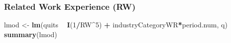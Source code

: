 \documentclass[
]{article}
\newenvironment{Shaded}{\begin{snugshade}}{\end{snugshade}}
\newcommand{\DecValTok}[1]{\textcolor[rgb]{0.00,0.00,0.81}{#1}}
\newcommand{\KeywordTok}[1]{\textcolor[rgb]{0.13,0.29,0.53}{\textbf{#1}}}
\newcommand{\NormalTok}[1]{#1}
\newcommand{\OperatorTok}[1]{\textcolor[rgb]{0.81,0.36,0.00}{\textbf{#1}}}
\newcommand{\StringTok}[1]{\textcolor[rgb]{0.31,0.60,0.02}{#1}}
\begin{document}
\hypertarget{related-work-experience-rw}{%
\subsubsection{Related Work Experience
(RW)}\label{related-work-experience-rw}}

\begin{Shaded}
\begin{Highlighting}[]
\NormalTok{lmod <-}\StringTok{ }\KeywordTok{lm}\NormalTok{(quits }\OperatorTok{~}\StringTok{ }\KeywordTok{I}\NormalTok{(}\DecValTok{1}\OperatorTok{/}\NormalTok{RW}\OperatorTok{^}\DecValTok{5}\NormalTok{) }\OperatorTok{+}\StringTok{ }\NormalTok{industryCategoryWR}\OperatorTok{*}\NormalTok{period.num, q)}
\KeywordTok{summary}\NormalTok{(lmod)}
\end{Highlighting}
\end{Shaded}
\end{document}
